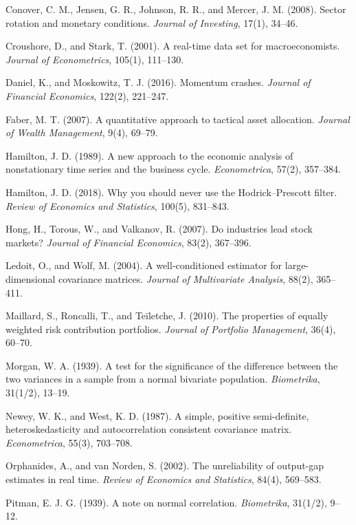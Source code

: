 \documentclass[11pt,a4paper]{article}
\begin{document}
Conover, C. M., Jensen, G. R., Johnson, R. R., and Mercer, J. M. (2008). Sector rotation and monetary conditions. \emph{Journal of Investing}, 17(1), 34--46.

Croushore, D., and Stark, T. (2001). A real-time data set for macroeconomists. \emph{Journal of Econometrics}, 105(1), 111--130.

Daniel, K., and Moskowitz, T. J. (2016). Momentum crashes. \emph{Journal of Financial Economics}, 122(2), 221--247.

Faber, M. T. (2007). A quantitative approach to tactical asset allocation. \emph{Journal of Wealth Management}, 9(4), 69--79.

Hamilton, J. D. (1989). A new approach to the economic analysis of nonstationary time series and the business cycle. \emph{Econometrica}, 57(2), 357--384.

Hamilton, J. D. (2018). Why you should never use the Hodrick--Prescott filter. \emph{Review of Economics and Statistics}, 100(5), 831--843.

Hong, H., Torous, W., and Valkanov, R. (2007). Do industries lead stock markets? \emph{Journal of Financial Economics}, 83(2), 367--396.

Ledoit, O., and Wolf, M. (2004). A well-conditioned estimator for large-dimensional covariance matrices. \emph{Journal of Multivariate Analysis}, 88(2), 365--411.

Maillard, S., Roncalli, T., and Teïletche, J. (2010). The properties of equally weighted risk contribution portfolios. \emph{Journal of Portfolio Management}, 36(4), 60--70.

Morgan, W. A. (1939). A test for the significance of the difference between the two variances in a sample from a normal bivariate population. \emph{Biometrika}, 31(1/2), 13--19.

Newey, W. K., and West, K. D. (1987). A simple, positive semi-definite, heteroskedasticity and autocorrelation consistent covariance matrix. \emph{Econometrica}, 55(3), 703--708.

Orphanides, A., and van Norden, S. (2002). The unreliability of output-gap estimates in real time. \emph{Review of Economics and Statistics}, 84(4), 569--583.

Pitman, E. J. G. (1939). A note on normal correlation. \emph{Biometrika}, 31(1/2), 9--12.

\endgroup
\end{document}
